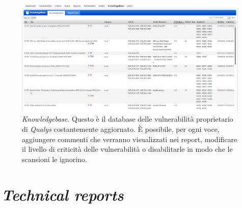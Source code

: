 \documentclass[target=bach,aauheader=]{thud}
\begin{document}
\begin{figure}
\centering
\includegraphics[scale=0.35]{images/qualys_kb.png}
    \caption{\textit{Knowledgebase}. Questo è il database delle vulnerabilità proprietario di \textit{Qualys} costantemente aggiornato. È possibile, per ogni voce, aggiungere commenti che verranno visualizzati nei report, modificare il livello di criticità delle vulnerabilità o disabilitarle in modo che le scansioni le ignorino.}
\end{figure}


\chapter{\textit{Technical reports}}
\label{appendix:b}

\backmatter




\end{document}
